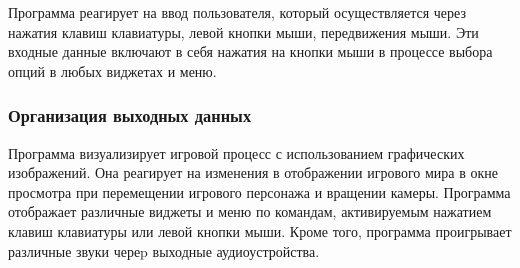Программа реагирует на ввод пользователя, который осуществляется через нажатия клавиш клавиатуры, левой кнопки мыши, передвижения мыши.
Эти входные данные включают в себя нажатия на кнопки мыши в процессе выбора опций в любых виджетах и меню.

\subsubsection{Организация выходных данных}

Программа визуализирует игровой процесс с использованием графических изображений. Она реагирует на изменения в отображении игрового мира в окне просмотра при перемещении игрового персонажа и вращении камеры. Программа отображает различные виджеты и меню по командам, активируемым нажатием клавиш клавиатуры или левой кнопки мыши. Кроме того, программа проигрывает различные звуки череp выходные аудиоустройства.
